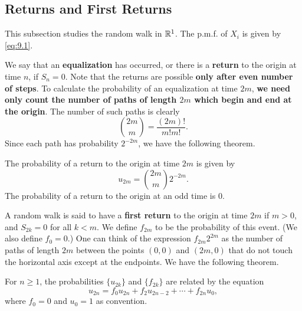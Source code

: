 \subsection{Returns and First Returns}
This subsection studies the random walk in $\mathbb{R}^1$. The p.m.f. of $X_i$ is given by \eqref{eq:9.1}.

We say that an \textbf{equalization} has occurred, or there is a \textbf{return} to the origin at time $n$, if $S_n = 0$. Note that the returns are possible \textbf{only after even number of steps}. To calculate
the probability of an equalization at time $2m$, \textbf{we need only count the number of paths of length $2m$ which begin and end at the origin}. The number of such paths is clearly
\begin{equation*}
    \binom{2m}{m} = \frac{(2m)!}{m! m!}.
\end{equation*}
Since each path has probability $2^{-2m}$, we have the following theorem.
\begin{theorem}
The probability of a return to the origin at time $2m$ is given by
\begin{equation*}
    u_{2 m}= \binom{2m}{m} 2^{-2 m}.
\end{equation*}
The probability of a return to the origin at an odd time is 0.
\end{theorem}

A random walk is said to have a \textbf{first return} to the origin at time $2m$ if $m > 0$, and $S_{2k} = 0$ for all $k < m$. We define $f_{2m}$ to be the probability of this event. (We also define $f_0 = 0$.) One can think
of the expression $f_{2m}2^{2m}$ as the number of paths of length $2m$ between the points $(0, 0)$ and $(2m, 0)$ that do not touch the horizontal axis except at the endpoints. We have the following theorem.
\begin{theorem}
For $n \geq 1$, the probabilities $\{u_{2k}\}$ and $\{f_{2k}\}$ are related by the equation
\begin{equation*}
    u_{2 n}=f_{0} u_{2 n}+f_{2} u_{2 n-2}+\cdots+f_{2 n} u_{0},
\end{equation*}
where $f_0 = 0$ and $u_0 = 1$ as convention.
\end{theorem}

